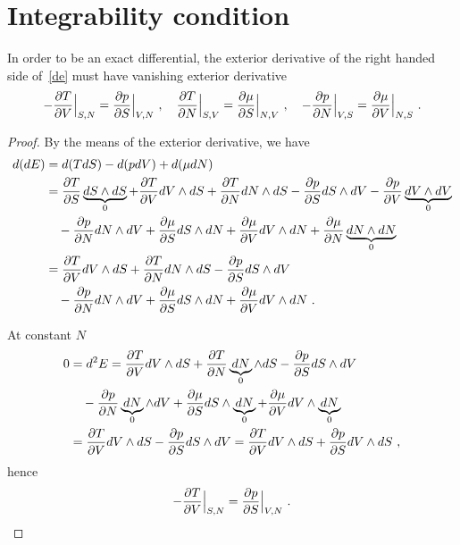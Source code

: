 \section{Integrability condition} 

    In order to be an exact differential, the exterior derivative of the right handed side of~\eqref{de} must have vanishing exterior derivative
    \begin{equation*}
        - \frac{\partial T}{\partial V} \Big \vert_{S,N} = \frac{\partial p}{\partial S} \Big \vert_{V,N} ~, \quad 
        \frac{\partial T}{\partial N} \Big \vert_{S,V} = \frac{\partial\mu}{\partial S} \Big \vert_{N, V} ~, \quad 
        - \frac{\partial p}{\partial N} \Big \vert_{V,S} = \frac{\partial\mu}{\partial V} \Big \vert_{N, S} ~. 
    \end{equation*}
    \begin{proof}
        By the means of the exterior derivative, we have 
        \begin{equation*}
        \begin{aligned}
            d (dE) & = d (T dS) - d (p dV) + d (\mu dN) \\ & = \frac{\partial T}{\partial S} \underbrace{dS \wedge dS}_0 + \frac{\partial T}{\partial V} dV \wedge dS + \frac{\partial T}{\partial N} dN \wedge dS - \frac{\partial p}{\partial S} dS \wedge dV - \frac{\partial p}{\partial V} \underbrace{dV \wedge dV}_0 \\ & \quad - \frac{\partial p}{\partial N} dN \wedge dV + \frac{\partial\mu}{\partial S} dS \wedge dN + \frac{\partial\mu}{\partial V} dV \wedge dN + \frac{\partial\mu}{\partial N} \underbrace{dN \wedge dN}_0 \\ & = \frac{\partial T}{\partial V} dV \wedge dS + \frac{\partial T}{\partial N} dN \wedge dS - \frac{\partial p}{\partial S} dS \wedge dV \\ & \quad - \frac{\partial p}{\partial N} dN \wedge dV + \frac{\partial\mu}{\partial S} dS \wedge dN + \frac{\partial\mu}{\partial V} dV \wedge dN ~.
        \end{aligned}
        \end{equation*}

        At constant $N$ 
        \begin{equation*}
        \begin{aligned}
            0 & = d^2 E = \frac{\partial T}{\partial V} dV \wedge dS + \frac{\partial T}{\partial N} \underbrace{dN}_0 \wedge dS - \frac{\partial p}{\partial S} dS \wedge dV \\ & \quad - \frac{\partial p}{\partial N} \underbrace{dN}_0 \wedge dV + \frac{\partial\mu}{\partial S} dS \wedge \underbrace{dN}_0 + \frac{\partial\mu}{\partial V} dV \wedge \underbrace{dN}_0 \\ & = \frac{\partial T}{\partial V} dV \wedge dS - \frac{\partial p}{\partial S} dS \wedge dV = \frac{\partial T}{\partial V} dV \wedge dS + \frac{\partial p}{\partial S} dV \wedge dS ~,
        \end{aligned}
        \end{equation*}
        hence 
        \begin{equation*}
            - \frac{\partial T}{\partial V} \Big \vert_{S,N} = \frac{\partial p}{\partial S} \Big \vert_{V,N} ~.
        \end{equation*}


\end{proof}
